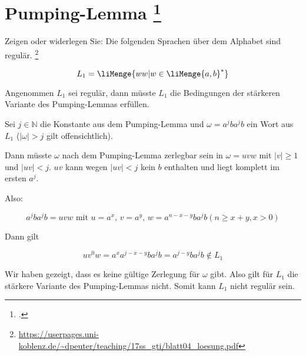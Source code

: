 \documentclass{bschlangaul-aufgabe}
\begin{document}
\let\m=\liMenge

\section{Pumping-Lemma
\footcite{}}

Zeigen oder widerlegen Sie: Die folgenden Sprachen über dem Alphabet
 sind regulär.
\footnote{\url{https://userpages.uni-koblenz.de/~dpeuter/teaching/17ss_gti/blatt04_loesung.pdf}}

\begin{liExkurs}
\liPumpingRegulaer
\end{liExkurs}

\begin{displaymath}
L_1 = \m{w w | w \in \m{a, b}^* }
\end{displaymath}

\begin{liAntwort}
\noindent
Angenommen $L_1$ sei regulär, dann müsste $L_1$ die Bedingungen der
stärkeren Variante des Pumping-Lemmas erfüllen.


\noindent
Sei $j \in \mathbb{N}$ die Konstante aus dem Pumping-Lemma und $\omega =
a^j b a^j b$ ein Wort aus $L_1$ ($|\omega| > j$ gilt offensichtlich).

Dann müsste $\omega$ nach dem Pumping-Lemma zerlegbar sein in $\omega =
uvw$ mit $|v| \geq 1$ und $|uv| < j$.
%
$uv$ kann wegen $|uv| < j$ kein $b$ enthalten und liegt komplett im
ersten $a^j$.

\noindent
Also:

\begin{displaymath}
a^j b a^j b = uvw \text{ mit }
u = a^x \text{, }
v = a^y \text{, }
w = a^{n - x - y} b a^j b (n \geq x + y, x > 0)
\end{displaymath}

\noindent
Dann gilt

\begin{displaymath}
u v^0 w = a^x a^{j - x - y} b a^j b = a^{j - y} b a^j b \notin L_1
\end{displaymath}

\noindent
Wir haben gezeigt, dass es keine gültige Zerlegung für $\omega$ gibt.
Also gilt für $L_1$ die stärkere Variante des Pumping-Lemmas nicht.
Somit kann $L_1$ nicht regulär sein.
\end{liAntwort}
\end{document}
